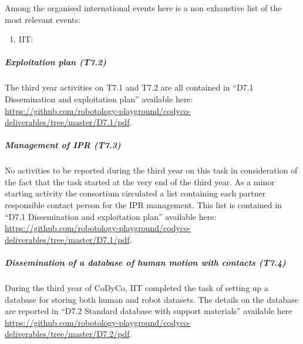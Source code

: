 Among the organised international events here is a non exhaustive list of the most relevant events:

\begin{enumerate}

\item IIT: 

\end{enumerate} 



\subparagraph*{Exploitation plan (T7.2)}

The third year activities on T7.1 and T7.2 are all contained in ``D7.1 Dissemination and exploitation plan'' available here: \url{https://github.com/robotology-playground/codyco-deliverables/tree/master/D7.1/pdf}.

\subparagraph*{Management of IPR (T7.3)}

No activities to be reported during the third year on this task in consideration of the fact that the task started at the very end of the third year. As a minor starting activity the consortium circulated a list containing each partner responsible contact person for the IPR management. This list is contained in ``D7.1 Dissemination and exploitation plan'' available here: \url{https://github.com/robotology-playground/codyco-deliverables/tree/master/D7.1/pdf}.

\subparagraph*{Dissemination of a database of human motion with contacts (T7.4)}

During the third year of CoDyCo, IIT completed the task of setting up a database for storing both human and robot datasets. The details on the database are reported in ``D7.2 Standard database with support materials'' available here \url{https://github.com/robotology-playground/codyco-deliverables/tree/master/D7.2/pdf}. 

